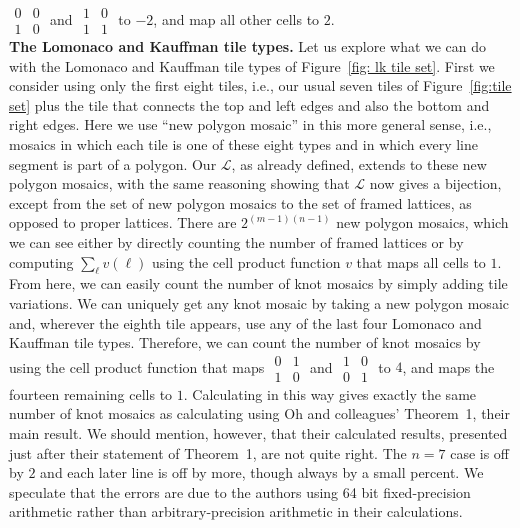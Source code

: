 \documentclass[12pt]{article}
\theoremstyle{plain}
\theoremstyle{remark}
\theoremstyle{definition}
\theoremstyle{remark}
\theoremstyle{definition}
\begin{document}
$\begin{smallmatrix}0&0\\ 1&0\end{smallmatrix}$ and $\begin{smallmatrix}1&0\\ 1&1\end{smallmatrix}$ to $-2$, and map all other cells to $2$.
\\

\noindent \textbf{The Lomonaco and Kauffman tile types.} Let us explore what we can do with the Lomonaco and Kauffman tile types of Figure~\ref{fig: lk tile set}. First we consider using only the first eight tiles, i.e., our usual seven tiles of Figure~\ref{fig:tile set} plus the tile that connects the top and left edges and also the bottom and right edges. Here we use ``new polygon mosaic'' in this more general sense, i.e., mosaics in which each tile is one of these eight types and in which every line segment is part of a polygon. Our $\mathscr{L}$, as already defined, extends to these new polygon mosaics, with the same reasoning showing that $\mathscr{L}$ now gives a bijection, except from the set of new polygon mosaics to the set of framed lattices, as opposed to proper lattices. There are $2^{\left(m-1\right)\left(n-1\right)}$ new polygon mosaics, which we can see either by directly counting the number of framed lattices or by computing $\sum_{\ell}v\left(\ell\right)$ using the cell product function $v$ that maps all cells to $1$. From here, we can easily count the number of knot mosaics by simply adding tile variations. We can uniquely get any knot mosaic by taking a new polygon mosaic and, wherever the eighth tile appears, use any of the last four Lomonaco and Kauffman tile types. Therefore, we can count the number of knot mosaics by using the cell product function that maps $\begin{smallmatrix}0 & 1\\ 1 & 0 \end{smallmatrix}$ and $\begin{smallmatrix}1 & 0\\ 0 & 1 \end{smallmatrix}$ to $4$, and maps the fourteen remaining cells to $1$. Calculating in this way gives exactly the same number of knot mosaics as calculating using Oh and colleagues' Theorem~1, their main result. We should mention, however, that their calculated results, presented just after their statement of Theorem~1, are not quite right. The $n=7$ case is off by $2$ and each later line is off by more, though always by a small percent. We speculate that the errors are due to the authors using 64 bit fixed-precision arithmetic rather than arbitrary-precision arithmetic in their calculations.
\end{document}
